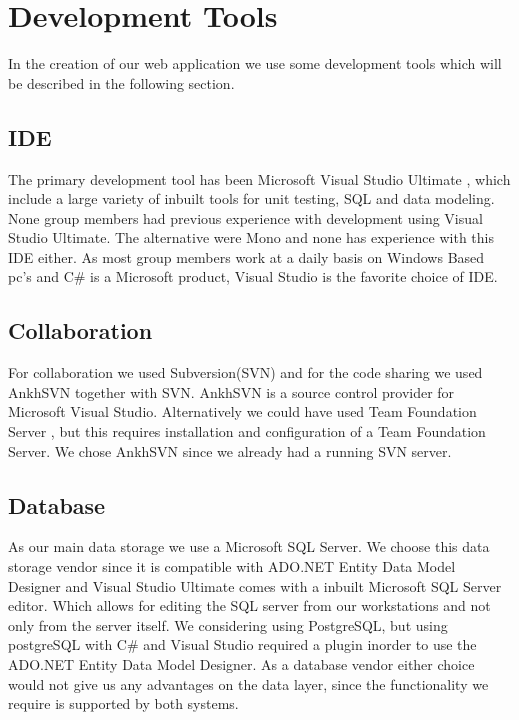 \section{Development Tools}
In the creation of our web application we use some development tools which will be described in the following section. 

\subsection{IDE}
\label{sub:ide}
The primary development tool has been Microsoft Visual Studio Ultimate \cite{visualStudio}, which include a large variety of inbuilt tools for unit testing, SQL and data modeling. 
None group members had previous experience with development using Visual Studio Ultimate. The alternative were Mono and none has experience with this IDE either. 
As most group members work at a daily basis on Windows Based pc's and C\# is a Microsoft product, Visual Studio is the favorite choice of IDE. 



\subsection{Collaboration}
\label{sub:collaboration}
For collaboration we used Subversion(SVN) and for the code sharing we used AnkhSVN \cite{ankhsvn} together with SVN. 
AnkhSVN is a source control provider for Microsoft Visual Studio. 
Alternatively we could have used Team Foundation Server \cite{teamfoundation}, but this requires installation and configuration of a Team Foundation Server. We chose AnkhSVN since we already had a running SVN server. 

\subsection{Database}
\label{sub:database}
As our main data storage we use a Microsoft SQL Server. 
We choose this data storage vendor since it is compatible with ADO.NET Entity Data Model Designer and Visual Studio Ultimate comes with a inbuilt Microsoft SQL Server editor. 
Which allows for editing the SQL server from our workstations and not only from the server itself. 
We considering using PostgreSQL, but using postgreSQL with C\# and Visual Studio required a plugin inorder to use the ADO.NET Entity Data Model Designer. As a database vendor either choice would not give us any advantages on the data layer, since the functionality we require is supported by both systems. 